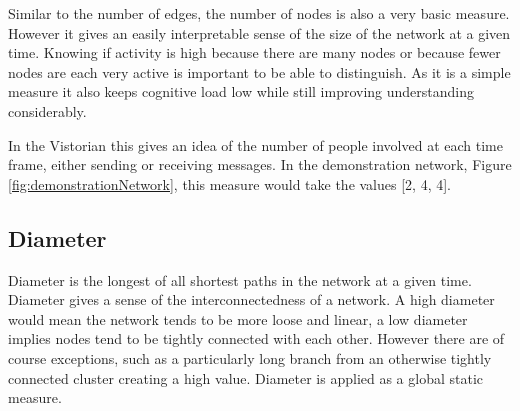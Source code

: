 Similar to the number of edges, the number of nodes is also a very basic measure. However it gives an easily interpretable sense of the size of the network at a given time. Knowing if activity is high because there are many nodes or because fewer nodes are each very active is important to be able to distinguish. As it is a simple measure it also keeps cognitive load low while still improving understanding considerably.

In the Vistorian this gives an idea of the number of people involved at each time frame, either sending or receiving messages. 
In the demonstration network, Figure \ref{fig:demonstrationNetwork}, this measure would take the values [2, 4, 4]. 


\subsection{Diameter}
Diameter is the longest of all shortest paths in the network at a given time. Diameter gives a sense of the interconnectedness of a network. A high diameter would mean the network tends to be more loose and linear, a low diameter implies nodes tend to be tightly connected with each other. However there are of course exceptions, such as a particularly long branch from an otherwise tightly connected cluster creating a high value. Diameter is applied as a global static measure.

